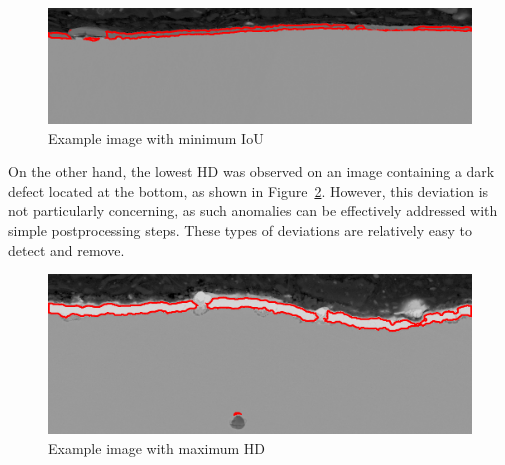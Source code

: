  \begin{figure} [H]
    \centering 
    \includegraphics[width=0.70\linewidth]{PICTURES/eval/66.png} \caption{Example image with minimum IoU} \label{fig:min_iou}
 \end{figure}
On the other hand, the lowest HD was observed on an image containing a dark defect located at the bottom, as shown in Figure~\ref{fig:max_hd}. However, this deviation is not particularly concerning, as such anomalies can be effectively addressed with simple postprocessing steps. These types of deviations are relatively easy to detect and remove.
 \begin{figure}[H]
        \centering
        \includegraphics[width=0.65\linewidth]{PICTURES/eval/113.png}
        \caption{Example image with maximum HD}
        \label{fig:max_hd}
    \end{figure}


